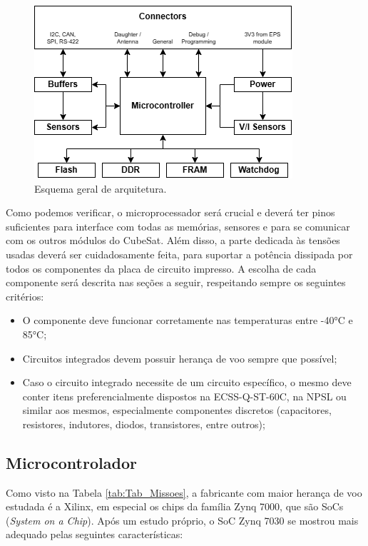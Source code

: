 \begin{figure}[H]
    \centering
    \includegraphics[scale=0.8]{images/arquitetura geral.png}
    \caption{Esquema geral de arquitetura.}
    \label{fig:arq_geral}
\end{figure}

Como podemos verificar, o microprocessador será crucial e deverá ter pinos suficientes para interface com todas as memórias, sensores e para se comunicar com os outros módulos do CubeSat. Além disso, a parte dedicada às tensões usadas deverá ser cuidadosamente feita, para suportar a potência dissipada por todos os componentes da placa de circuito impresso. A escolha de cada componente será descrita nas seções a seguir, respeitando sempre os seguintes critérios:

\begin{itemize}
	\item O componente deve funcionar corretamente nas temperaturas entre -40°C e 85°C;
	\item Circuitos integrados devem possuir herança de voo sempre que possível;
	\item Caso o circuito integrado necessite de um circuito específico, o mesmo deve conter itens preferencialmente dispostos na ECSS-Q-ST-60C, na NPSL ou similar aos mesmos, especialmente componentes discretos (capacitores, resistores, indutores, diodos, transistores, entre outros);
\end{itemize}

\subsection{Microcontrolador}

Como visto na Tabela \ref{tab:Tab_Missoes}, a fabricante com maior herança de voo estudada é a Xilinx, em especial os chips da família Zynq 7000, que são SoCs (\textit{System on a Chip}). Após um estudo próprio, o SoC Zynq 7030 se mostrou mais adequado pelas seguintes características:

